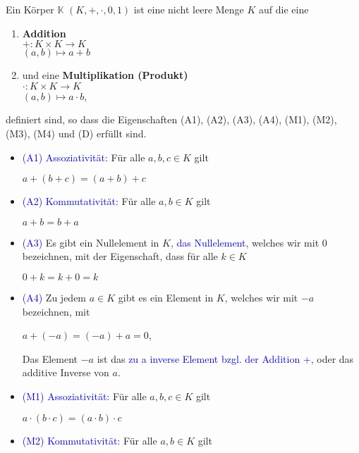 \begin{definition}
Ein Körper $\mathbb{K}$ $(K,+,\cdot,0,1)$ ist eine nicht leere Menge $K$ auf die eine
\begin{enumerate}
    \item \textbf{Addition}\\
    $+ :K\times K\rightarrow K$\\
    $(a,b) \mapsto a + b$
    \item und eine \textbf{Multiplikation (Produkt)}\\
    $\cdot :K\times K\rightarrow K$\\
    $(a,b) \mapsto a \cdot b$,
\end{enumerate}
definiert sind, so dass die Eigenschaften (A1), (A2), (A3), (A4), (M1), (M2), (M3), (M4) und (D) erfüllt sind.
\begin{itemize}
    \item \textcolor{blue}{(A1) Assoziativität:} Für alle $a,b,c \in K$ gilt
    \begin{center}
        $a + (b + c) = (a + b) + c$
    \end{center}
    \item \textcolor{blue}{(A2) Kommutativität:} Für alle $a,b \in K$ gilt
    \begin{center}
        $a + b = b + a$
    \end{center}
    \item \textcolor{blue}{(A3)} Es gibt ein Nullelement in $K$, \textcolor{blue}{das Nullelement}, welches wir mit 0 bezeichnen, mit der Eigenschaft, dass für alle $k \in K$
    \begin{center}
        $0 + k = k + 0 = k$
    \end{center}
    \item \textcolor{blue}{(A4)} Zu jedem $a \in K$ gibt es ein Element in $K$, welches wir mit $-a$ bezeichnen, mit
    \begin{center}
        $a + (-a) = (-a) + a = 0$,
    \end{center}
    Das Element $-a$ ist das \textcolor{blue}{zu a inverse Element bzgl. der Addition +}, oder das additive Inverse von $a$.
    \item \textcolor{blue}{(M1) Assoziativität:} Für alle $a,b,c \in K$ gilt
    \begin{center}
        $a \cdot (b \cdot c) = (a \cdot b) \cdot c$
    \end{center}
    \item \textcolor{blue}{(M2) Kommutativität:} Für alle $a,b \in K$ gilt
    \begin{center}

\end{center}
\end{itemize}
\end{definition}
